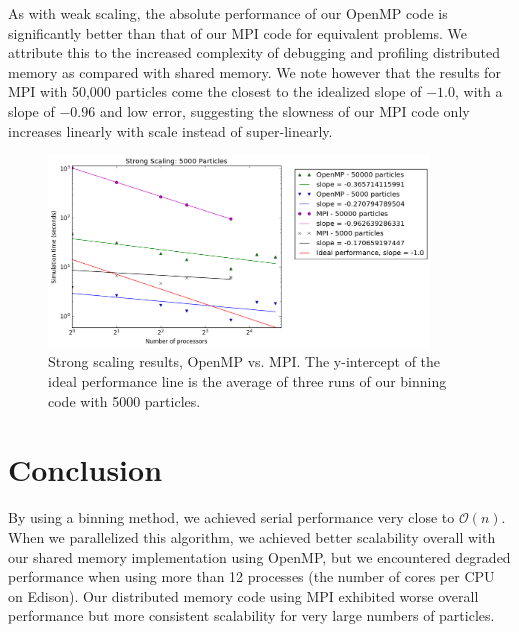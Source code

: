 \documentclass{article}
\begin{document}
As with weak scaling, the absolute performance of our OpenMP code is
significantly better than that of our MPI code for equivalent problems. We
attribute this to the increased complexity of debugging and profiling
distributed memory as compared with shared memory. We note however that the
results for MPI with 50,000 particles come the closest to the idealized slope of
$-1.0$, with a slope of $-0.96$ and low error, suggesting the slowness of our
MPI code only increases linearly with scale instead of super-linearly.
\begin{figure}[ht!]
\centering
\includegraphics[width=0.9\textwidth]{strong.png}
\caption{Strong scaling results, OpenMP vs. MPI. The y-intercept of
the ideal performance line is the average of three runs of our binning
code with 5000 particles.}\label{fig:strong}
\end{figure}
\section{Conclusion}
By using a binning method, we achieved serial performance very close to
$\mathcal{O}(n)$. When we parallelized this algorithm, we achieved better
scalability overall with our shared memory implementation using OpenMP, but we
encountered degraded performance when using more than 12 processes (the number
of cores per CPU on Edison). Our distributed memory code using MPI exhibited
worse overall performance but more consistent scalability for very large numbers
of particles.
\clearpage


\end{document}
